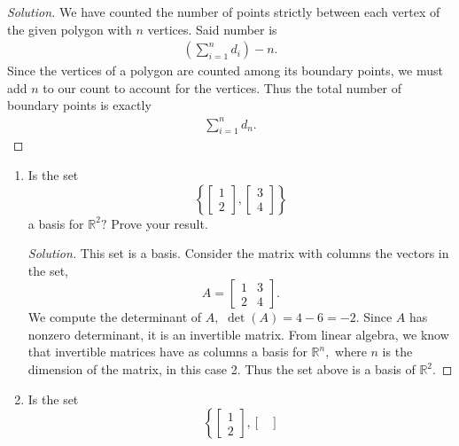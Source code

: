 \documentclass[12pt]{article}
\newcommand{\R}{\mathbb{R}}
\newenvironment{exercise}[2][Exercise]{\begin{trivlist}
        \item[\hskip \labelsep {\bfseries #1}\hskip \labelsep {\bfseries #2.}]}{\end{trivlist}}
\newenvironment{solution}
        {\begin{proof}[Solution]}
                    {\end{proof}}
\begin{document}
\begin{exercise}{28}
\begin{solution}
        We have counted the number of points strictly between each vertex of the given polygon with \( n \) vertices. Said number is
        \begin{align*}
            \left(\sum_{i=1}^n d_{i}\right) - n.
        \end{align*}
        Since the vertices of a polygon are counted among its boundary points, we must add \( n \) to our count to account for the vertices. Thus the total number of boundary points is exactly
        \begin{align*}
            \sum_{i=1}^n d_{n} .
        \end{align*}
    \end{solution}
\end{exercise}

\begin{exercise}{29}
    \begin{enumerate}[label=(\alph*)]
        \item Is the set $$ \left\{ \begin{bmatrix}
                 1\\
                 2
        \end{bmatrix} , \begin{bmatrix}
             3\\
             4
        \end{bmatrix}\right\}  $$ a basis for \( \R^{2} ? \) Prove your result.
            \begin{solution}
                This set is a basis. Consider the matrix with columns the vectors in the set, $$ A = \begin{bmatrix}
                    1 & 3\\
                    2 & 4
                \end{bmatrix} .$$ We compute the determinant of \( A, \) \( \det(A) = 4 - 6 = -2. \) Since \( A \) has nonzero determinant, it is an invertible matrix. From linear algebra, we know that invertible matrices have as columns a basis for \( \R^{n} , \) where \( n \) is the dimension of the matrix, in this case 2. Thus the set above is a basis of \( \R^{2} . \)
            \end{solution}
        \item Is the set $$ \left\{ \begin{bmatrix}
                 1\\
                 2
        \end{bmatrix} , \begin{bmatrix}

\end{bmatrix}$$
\end{enumerate}
\end{exercise}
\end{document}
